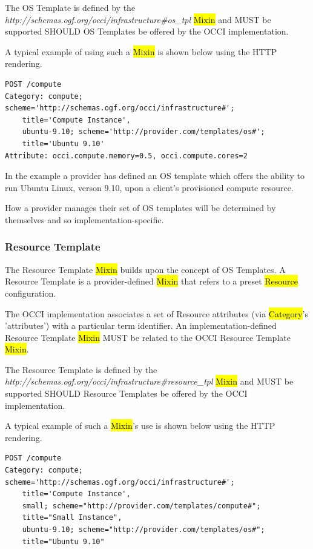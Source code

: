 \documentclass[10pt,a4paper]{article}
\begin{document}
The OS Template 
is defined by the \textit{http://schemas.ogf.org/occi/infrastructure\#os\_tpl} \hl{Mixin} and
MUST be supported SHOULD OS Templates be offered by the OCCI implementation.

A typical example of using such a \hl{Mixin} is shown below using the HTTP rendering.

\begin{verbatim}
POST /compute
Category: compute; scheme='http://schemas.ogf.org/occi/infrastructure#'; 
    title='Compute Instance', 
    ubuntu-9.10; scheme='http://provider.com/templates/os#'; 
    title='Ubuntu 9.10'
Attribute: occi.compute.memory=0.5, occi.compute.cores=2
\end{verbatim}
In the example a provider has defined an OS template which offers the ability to run Ubuntu Linux,
verson 9.10, upon a client's provisioned compute resource.

How a provider manages their set of OS templates will be determined by themselves and so 
implementation-specific.

\subsubsection{Resource Template}
The Resource Template \hl{Mixin} builds upon the concept of OS Templates. A Resource Template is
a provider-defined \hl{Mixin} that refers to a preset \hl{Resource} configuration. 

The OCCI implementation associates a set of Resource attributes (via \hl{Category}'s 'attributes') with 
a particular term identifier. An implementation-defined Resource Template \hl{Mixin} MUST be related 
to the OCCI Resource Template \hl{Mixin}. 

The Resource Template is defined by the 
\textit{http://schemas.ogf.org/occi/infrastructure\#resource\_tpl} \hl{Mixin} and MUST be supported SHOULD Resource Templates be offered by the OCCI implementation.

A typical example of such a \hl{Mixin}'s use is shown below using the HTTP rendering. 

\begin{verbatim}
POST /compute
Category: compute; scheme='http://schemas.ogf.org/occi/infrastructure#'; 
    title='Compute Instance', 
    small; scheme="http://provider.com/templates/compute#"; 
    title="Small Instance", 
    ubuntu-9.10; scheme="http://provider.com/templates/os#"; 
    title="Ubuntu 9.10"
\end{verbatim}
\end{document}
